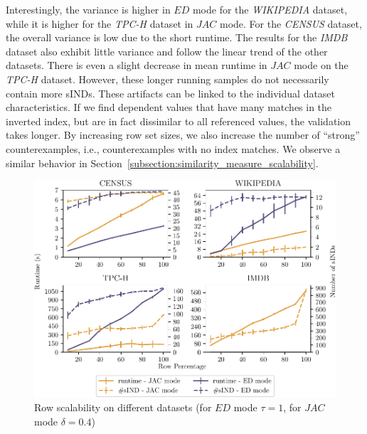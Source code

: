 Interestingly, the variance is higher in $ED$ mode for the \emph{WIKIPEDIA} dataset, while it is higher for the \emph{TPC-H} dataset in $JAC$ mode.
For the \emph{CENSUS} dataset, the overall variance is low due to the short runtime.
The results for the \emph{IMDB} dataset also exhibit little variance and follow the linear trend of the other datasets.
There is even a slight decrease in mean runtime in $JAC$ mode on the \emph{TPC-H} dataset.
However, these longer running samples do not necessarily contain more sINDs.
These artifacts can be linked to the individual dataset characteristics.
If we find dependent values that have many matches in the inverted index, but are in fact dissimilar to all referenced values, the validation takes longer.
By increasing row set sizes, we also increase the number of ``strong'' counterexamples, i.e., counterexamples with no index matches.
We observe a similar behavior in Section~\ref{subsection:similarity_measure_scalability}.


\begin{figure}[ht]
    \centering
    \includegraphics[width=.8\columnwidth]{figures/row_scaling.pdf}
    \caption{Row scalability on different datasets (for $ED$ mode $\tau = 1$, for $JAC$ mode $\delta = 0.4$)}
    \label{fig:eval:row}
\end{figure}

